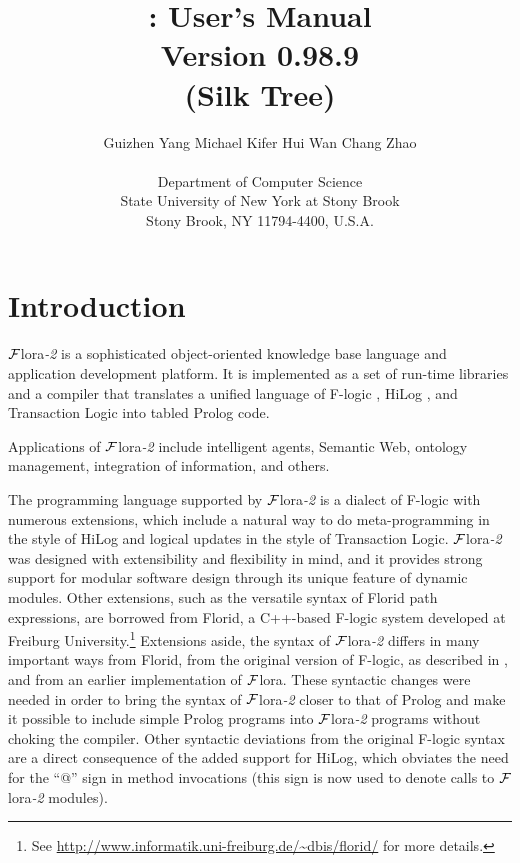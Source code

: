 \documentclass[11pt]{article}
\title{
        \FLORA: User's Manual
           \\
       {\Large Version 0.98.9}
       \vspace{-2mm}\\
       {\large (Silk Tree)}
       }
\author{
  {Guizhen Yang
  \hspace{1cm}
  Michael Kifer
  \hspace{1cm}
  Hui Wan
  \hspace{1cm}
  Chang Zhao
}
  \\\\
  Department of Computer Science\\
  State University of New York at Stony Brook\\
  Stony Brook, NY 11794-4400, U.S.A.
  }
\newcommand{\FLORA}{{\mbox{\sc ${\cal F}${lora}\rm\emph{-2}}}\xspace}
\newcommand{\FLORAone}{{\mbox{${\cal F}${\sc lora}}}\xspace}
\newcommand{\FLORID}{{\mbox{\sc Florid}}\xspace}
\newcommand{\fl}{\mbox{F-logic}\xspace}
\begin{document}
\maketitle
\thispagestyle{empty}

\newpage
{}
\setcounter{page}{1}

\tableofcontents

\newpage

\setcounter{page}{1}


\section{Introduction}\label{sec-intro}

\FLORA is a sophisticated object-oriented knowledge base language and
application development platform. It is implemented as a set of run-time
libraries and a compiler that translates a unified language of \fl
\cite{KLW95}, HiLog \cite{hilog-jlp}, and Transaction Logic
\cite{trans-chapter-98,trans-tcs94} into tabled Prolog code.

Applications of \FLORA include intelligent agents, Semantic Web, ontology
management, integration of information, and others. 

The programming language supported by \FLORA is a dialect of \fl with
numerous extensions, which include a natural way to do meta-programming in
the style of HiLog and logical updates in the style of Transaction
Logic. \FLORA was designed with extensibility and flexibility in mind, and
it provides strong support for modular software design through its unique
feature of dynamic modules.
Other extensions, such as the versatile syntax of \FLORID path
expressions, are borrowed from
\FLORID, a C++-based \fl system developed at
Freiburg University.\footnote{
  See \url{http://www.informatik.uni-freiburg.de/~dbis/florid/} for more
  details.
}
Extensions aside, the syntax of \FLORA differs in many
important ways from \FLORID, from the original version of \fl, as described
in \cite{KLW95}, and from an earlier implementation of \FLORAone. These
syntactic changes were needed in order to bring the syntax of \FLORA closer
to that of Prolog and make it possible to include simple Prolog programs
into \FLORA programs without choking the compiler.  Other syntactic
deviations from the original F-logic syntax are a direct consequence of the
added support for HiLog, which obviates the need for the ``@'' sign in
method invocations (this sign is now used to denote calls to \FLORA
modules).
\end{document}
